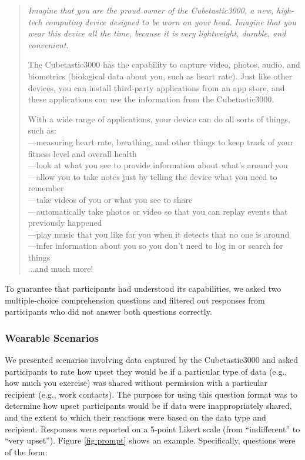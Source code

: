 \documentclass{sig-alternate-hotpets15}
\begin{document}
\begin{quotation}
{\it Imagine that you are the proud owner of the Cubetastic3000, a new, high-tech computing device designed to be worn on your head. Imagine that you wear this device all the time, because it is very lightweight, durable, and convenient.

The Cubetastic3000 has the capability to capture video, photos, audio, and biometrics (biological data about you, such as heart rate). Just like other devices, you can install third-party applications from an app store, and these applications can use the information from the Cubetastic3000.

With a wide range of applications, your device can do all sorts of things, such as:\\

\noindent---measuring heart rate, breathing, and other things to keep track of your fitness level and overall health\\
\noindent---look at what you see to provide information about what's around you\\
\noindent---allow you to take notes just by telling the device what you need to remember\\
\noindent---take videos of you or what you see to share\\
\noindent---automatically take photos or video so that you can replay events that previously happened\\
\noindent---play music that you like for you when it detects that no one is around\\
\noindent---infer information about you so you don't need to log in or search for things\\
\noindent ...and much more!}
\end{quotation}

To guarantee that participants had understood its capabilities, we asked two multiple-choice comprehension questions and filtered out responses from participants who did not answer both questions correctly.

\subsubsection{Wearable Scenarios}
We presented scenarios involving data captured by the Cubetastic3000 and asked participants to rate how upset they would be if a particular type of data (e.g., how much you exercise) was shared without permission with a particular recipient (e.g., work contacts). The purpose for using this question format was to determine how upset participants would be if data were inappropriately shared, and the extent to which their reactions were based on the data type and recipient. Responses were reported on a 5-point Likert scale (from ``indifferent'' to ``very upset''). Figure \ref{fig:prompt} shows an example.  Specifically, questions were of the form: 
\end{document}
